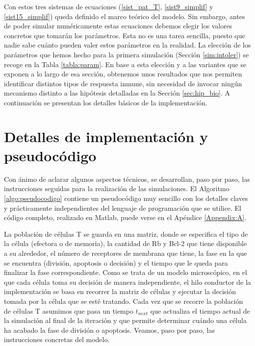 Con estos tres sistemas de ecuaciones (\ref{sist_pat_T}, \ref{sist9_simplif} y \ref{sist15_simplif}) queda definido el marco teórico del modelo. Sin embargo, antes de poder simular numéricamente estas ecuaciones debemos elegir los valores concretos que tomarán los parámetros. Esta no es una tarea sencilla, puesto que nadie sabe cuánto pueden valer estos parámetros en la realidad. La elección de los parámetros que hemos hecho para la primera simulación (Sección \ref{sim:intoler}) se recoge en la Tabla \ref{tabla:param}. En base a esta elección y a las variantes que se exponen a lo largo de esa sección, obtenemos unos resultados que nos permiten identificar distintos tipos de respuesta inmune, sin necesidad de invocar ningún mecanismo distinto a las hipótesis detalladas en la Sección \ref{sec:hip_bio}. A continuación se presentan los detalles básicos de la implementación.


\section{Detalles de implementación y pseudocódigo}

Con ánimo de aclarar algunos aspectos técnicos, se desarrollan, paso por paso, las instrucciones seguidas para la realización de las simulaciones. El Algoritmo \ref{algo:pseudocodigo} contiene un pseudocódigo muy sencillo con los detalles claves y prácticamente independientes del lenguaje de programación que se utilice. El código completo, realizado en Matlab, puede verse en el Apéndice \ref{Appendix:A}.

La población de células T se guarda en una matriz, donde se especifica el tipo de la célula (efectora o de memoria), la cantidad de Rb y Bcl-2 que tiene disponible a su alrededor, el número de receptores de membrana que tiene, la fase en la que se encuentra (división, apoptosis o decisión) y el tiempo que le queda para finalizar la fase correspondiente. Como se trata de un modelo microscópico, en el que cada célula toma su decisión de manera independiente, el hilo conductor de la implementación se basa en recorrer la matriz de células y ejecutar la decisión tomada por la célula que se esté tratando. Cada vez que se recorre la población de células T asumimos que pasa un tiempo $t_{next}$ que actualiza el tiempo actual de la simulación al final de la iteración y que permite determinar cuándo una célula ha acabado la fase de división o apoptosis. Veamos, paso por paso, las instrucciones concretas del modelo.

